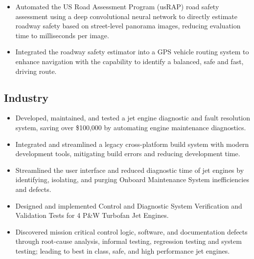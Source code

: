 \documentclass[11pt,a4paper,sans]{moderncv} %
\begin{document}
{
\begin{itemize} 
	\item Automated the US Road Assessment Program (usRAP) road safety assessment using a deep convolutional neural network to directly estimate roadway safety based on street-level panorama images, reducing evaluation time to milliseconds per image.
	\item Integrated the roadway safety estimator into a GPS vehicle routing system to enhance navigation with the capability to identify a balanced, safe and fast, driving route.
\end{itemize}
}


\subsection{Industry}

{
	\begin{itemize}
		\item Developed, maintained, and tested a jet engine diagnostic and fault resolution system, saving over \$100,000 by automating engine maintenance diagnostics.
		\item Integrated and streamlined a legacy cross-platform build system with modern development tools, mitigating build errors and reducing development time.
	\end{itemize}
}


{
\begin{itemize}
	\item Streamlined the user interface and reduced diagnostic time of jet engines by identifying, isolating, and purging Onboard Maintenance System inefficiencies and defects.
\end{itemize}
}


{
\begin{itemize}
	\item Designed and implemented Control and Diagnostic System Verification and Validation Tests for 4 P\&W Turbofan Jet Engines. 
	\item Discovered mission critical control logic, software, and documentation defects through root-cause analysis, informal testing, regression testing and system testing; leading to best in class, safe, and high performance jet engines.
\end{itemize}
}
\end{document}

